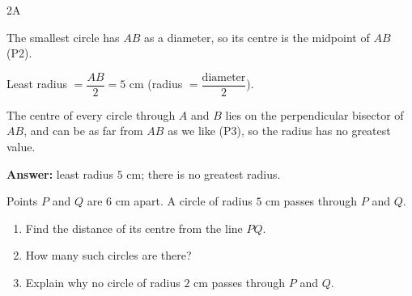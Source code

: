 \begin{exercise}{2A}
\begin{solution}
\begin{steps}
  \item The smallest circle has $AB$ as a diameter, so its centre is the midpoint of $AB$ (P2).
  \item Least radius $=\dfrac{AB}{2}=5$ cm (radius $=\dfrac{\text{diameter}}{2}$).
  \item The centre of every circle through $A$ and $B$ lies on the perpendicular bisector of $AB$, and can be as far from $AB$ as we like (P3), so the radius has no greatest value.
\end{steps}
\textbf{Answer:} least radius $5$ cm; there is no greatest radius.
\end{solution}
\item Points $P$ and $Q$ are $6$ cm apart. A circle of radius $5$ cm passes through $P$ and $Q$.
  \begin{enumerate}[label=(\alph*),itemsep=1pt]
    \item Find the distance of its centre from the line $PQ$.
    \item How many such circles are there?
    \item Explain why no circle of radius $2$ cm passes through $P$ and $Q$.
  \end{enumerate}
\begin{solution}
\end{solution}
\end{exercise}
